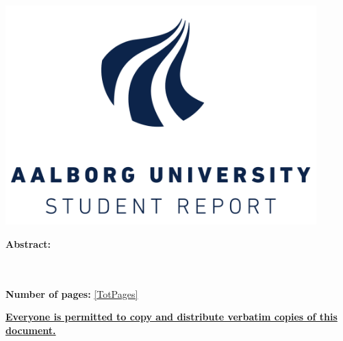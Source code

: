  ~
\begin{minipage}[T]{0.55\textwidth}
 \begin{flushright}
  \includegraphics[width=0.9\textwidth]{images/aau_logo.pdf}\\
 \end{flushright}
 \begin{flushleft}
  \textbf{Abstract:}\\
  


 \end{flushleft}
\end{minipage}\\
\\\large{\textsf{\textbf{\normalsize{Number of pages:}}}} \ref{TotPages}\\
\begin{center}
 \begin{scriptsize}
  \textbf{\underline{Everyone is permitted to copy and distribute verbatim copies of this document.}}
 \end{scriptsize}
\end{center}
